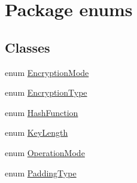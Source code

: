 \hypertarget{namespaceenums}{}\section{Package enums}
\label{namespaceenums}
\subsection*{Classes}
\begin{DoxyCompactItemize}
\item 
enum \mbox{\hyperlink{enumenums_1_1_encryption_mode}{Encryption\+Mode}}
\item 
enum \mbox{\hyperlink{enumenums_1_1_encryption_type}{Encryption\+Type}}
\item 
enum \mbox{\hyperlink{enumenums_1_1_hash_function}{Hash\+Function}}
\item 
enum \mbox{\hyperlink{enumenums_1_1_key_length}{Key\+Length}}
\item 
enum \mbox{\hyperlink{enumenums_1_1_operation_mode}{Operation\+Mode}}
\item 
enum \mbox{\hyperlink{enumenums_1_1_padding_type}{Padding\+Type}}
\end{DoxyCompactItemize}
